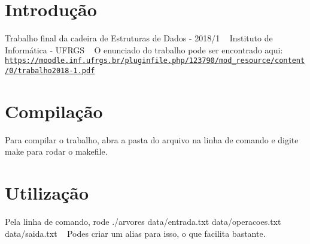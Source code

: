 \hypertarget{index_intro_sec}{}\section{Introdução}\label{index_intro_sec}
Trabalho final da cadeira de Estruturas de Dados -\/ 2018/1 ~\newline
 Instituto de Informática -\/ U\+F\+R\+GS ~\newline
 O enunciado do trabalho pode ser encontrado aqui\+: \href{https://moodle.inf.ufrgs.br/pluginfile.php/123790/mod_resource/content/0/trabalho2018-1.pdf}{\tt https\+://moodle.\+inf.\+ufrgs.\+br/pluginfile.\+php/123790/mod\+\_\+resource/content/0/trabalho2018-\/1.\+pdf}\hypertarget{index_install_sec}{}\section{Compilação}\label{index_install_sec}
Para compilar o trabalho, abra a pasta do arquivo na linha de comando e digite {\ttfamily make} para rodar o makefile.\hypertarget{index_utiliz_sec}{}\section{Utilização}\label{index_utiliz_sec}
Pela linha de comando, rode {\ttfamily ./arvores data/entrada.\+txt data/operacoes.\+txt data/saida.\+txt} ~\newline
Podes criar um alias para isso, o que facilita bastante. 
